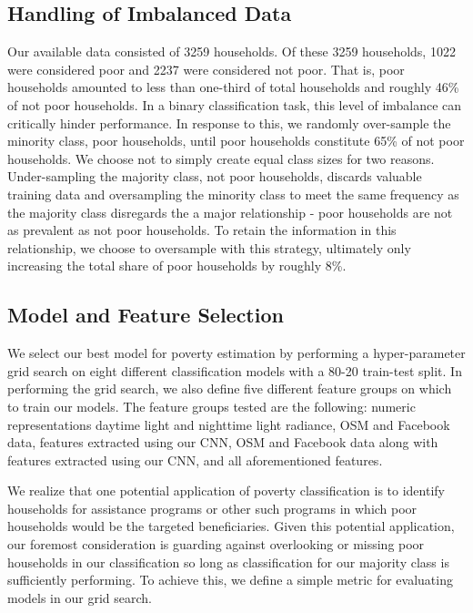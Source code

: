 \documentclass[8pt, oneside]{article}
\begin{document}
\subsection*{Handling of Imbalanced Data}
Our available data consisted of 3259 households. Of these 3259 households, 1022 were considered poor and 2237 were considered not poor. That is, poor households amounted to less than one-third of total households and roughly 46\% of not poor households. In a binary classification task, this level of imbalance can critically hinder performance. In response to this, we randomly over-sample the minority class, poor households, until poor households constitute 65\% of not poor households. We choose not to simply create equal class sizes for two reasons. Under-sampling the majority class, not poor households, discards valuable training data and oversampling the minority class to meet the same frequency as the majority class disregards the a major relationship - poor households are not as prevalent as not poor households. To retain the information in this relationship, we choose to oversample with this strategy, ultimately only increasing the total share of poor households by roughly 8\%.

\subsection*{Model and Feature Selection}
We select our best model for poverty estimation by performing a hyper-parameter grid search on eight different classification models with a 80-20 train-test split. In performing the grid search, we also define five different feature groups on which to train our models. The feature groups tested are the following: numeric representations daytime light and nighttime light radiance, OSM and Facebook data, features extracted using our CNN, OSM and Facebook data along with features extracted using our CNN, and all aforementioned features.
\par
We realize that one potential application of poverty classification is to identify households for assistance programs or other such programs in which poor households would be the targeted beneficiaries. Given this potential application, our foremost consideration is guarding against overlooking or missing poor households in our classification so long as classification for our majority class is sufficiently performing. To achieve this, we define a simple metric for evaluating models in our grid search.
\end{document}

